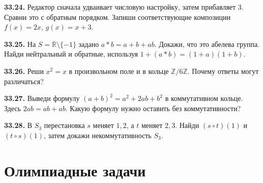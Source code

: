 \noindent\begin{minipage}[t]{\linewidth}\textbf{33.24.} Редактор сначала удваивает числовую настройку, затем прибавляет \(3\). Сравни это с обратным порядком. Запиши соответствующие композиции \(f(x)=2x\), \(g(x)=x+3\).\par\end{minipage}\par
\noindent\begin{minipage}[t]{\linewidth}\textbf{33.25.}\starmark{} На \(S=\mathbb R\setminus\{-1\}\) задано \(a*b=a+b+ab\). Докажи, что это абелева группа. Найди нейтральный и обратные, используя \(1+(a*b)=(1+a)(1+b)\).\par\end{minipage}\par
\noindent\begin{minipage}[t]{\linewidth}\textbf{33.26.}\starmark{} Реши \(x^2=x\) в произвольном поле и в кольце \(\mathbb Z/6\mathbb Z\). Почему ответы могут различаться?\par\end{minipage}\par
\noindent\begin{minipage}[t]{\linewidth}\textbf{33.27.}\starmark{} Выведи формулу \((a+b)^2=a^2+2ab+b^2\) в коммутативном кольце. Здесь \(2ab=ab+ab\). Какую формулу нужно оставить без коммутативности?\par\end{minipage}\par
\noindent\begin{minipage}[t]{\linewidth}\textbf{33.28.}\starmark{} В \(S_3\) перестановка \(s\) меняет \(1,2\), а \(t\) меняет \(2,3\). Найди \((s\circ t)(1)\) и \((t\circ s)(1)\), затем докажи некоммутативность \(S_3\).\par\end{minipage}\par
\par{}\section*{Олимпиадные задачи}
